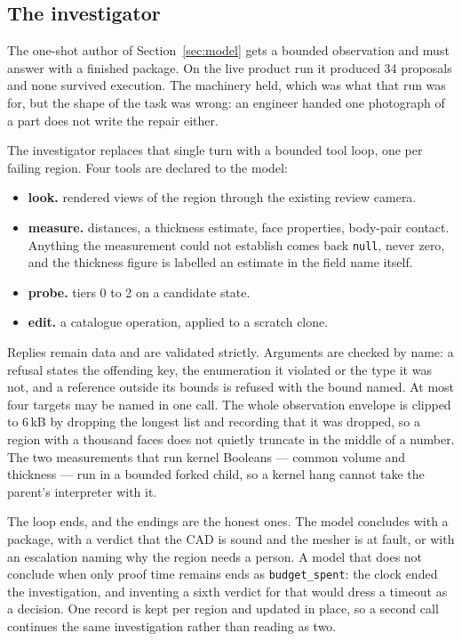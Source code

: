 \documentclass[10pt,onecolumn]{article}
\newcommand{\topic}[1]{\textbf{#1.}\hspace{0.5em}\ignorespaces}
\newcommand{\code}[1]{\texttt{\small #1}}
\begin{document}
\subsection{The investigator}\label{sec:investigator}

The one-shot author of Section~\ref{sec:model} gets a bounded observation and must answer with a
finished package. On the live product run it produced 34 proposals and none survived execution.
The machinery held, which was what that run was for, but the shape of the task was wrong: an
engineer handed one photograph of a part does not write the repair either.

The investigator replaces that single turn with a bounded tool loop, one per failing region. Four
tools are declared to the model:

\begin{itemize}
  \item \topic{look} rendered views of the region through the existing review camera.
  \item \topic{measure} distances, a thickness estimate, face properties, body-pair contact.
        Anything the measurement could not establish comes back \texttt{null}, never zero, and the
        thickness figure is labelled an estimate in the field name itself.
  \item \topic{probe} tiers 0 to 2 on a candidate state.
  \item \topic{edit} a catalogue operation, applied to a scratch clone.
\end{itemize}

Replies remain data and are validated strictly. Arguments are checked by name: a refusal states the
offending key, the enumeration it violated or the type it was not, and a reference outside its
bounds is refused with the bound named. At most four targets may be named in one call. The whole
observation envelope is clipped to 6\,kB by dropping the longest list and recording that it was
dropped, so a region with a thousand faces does not quietly truncate in the middle of a number.
The two measurements that run kernel Booleans --- common volume and thickness --- run in a bounded
forked child, so a kernel hang cannot take the parent's interpreter with it.

The loop ends, and the endings are the honest ones. The model concludes with a package, with a
verdict that the CAD is sound and the mesher is at fault, or with an escalation naming why the
region needs a person. A model that does not conclude when only proof time remains ends as
\code{budget\_spent}: the clock ended the investigation, and inventing a sixth verdict for that
would dress a timeout as a decision. One record is kept per region and updated in place, so a
second call continues the same investigation rather than reading as two.
\end{document}
